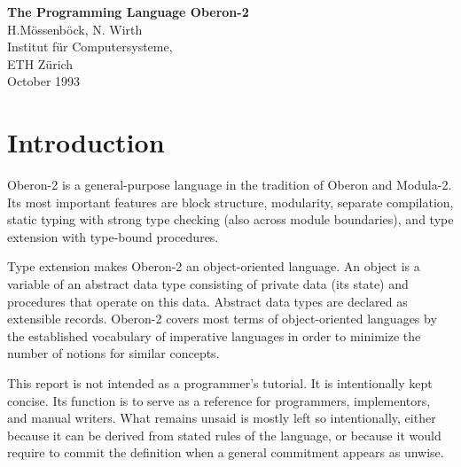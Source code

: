 \newif\ifonline\onlinefalse   %


\ifonline\title{Oberon-2 Report}\fi

\newif\ifcompact %


\makeindex




\begin{center}
{\large\bf The Programming Language Oberon-2} \\
H.M\"ossenb\"ock, N. Wirth  \\
Institut f\"ur Computersysteme, \\
ETH Z\"urich \\
October 1993 \\
\end{center}

\section{Introduction}

Oberon-2 is a general-purpose language in the tradition of Oberon
and Modula-2. Its most important features are block structure, modularity,
separate compilation, static typing with strong type checking (also
across module boundaries), and type extension with type-bound procedures.

Type extension makes Oberon-2 an object-oriented language. An object
is a variable of an abstract data type consisting of private data
(its state) and procedures that operate on this data. Abstract data
types are declared as extensible records. Oberon-2 covers most terms
of object-oriented languages by the established vocabulary of imperative
languages in order to minimize the number of notions for similar concepts.

This report is not intended as a programmer's tutorial. It is intentionally
kept concise. Its function is to serve as a reference for programmers,
implementors, and manual writers. What remains unsaid is mostly left
so intentionally, either because it can be derived from stated rules
of the language, or because it would require to commit the definition
when a general commitment appears as unwise.

